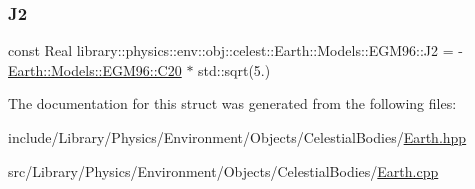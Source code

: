 \subsubsection{\texorpdfstring{J2}{J2}}
{\footnotesize\ttfamily const Real library\+::physics\+::env\+::obj\+::celest\+::\+Earth\+::\+Models\+::\+E\+G\+M96\+::\+J2 = -\/\hyperlink{structlibrary_1_1physics_1_1env_1_1obj_1_1celest_1_1_earth_1_1_models_1_1_e_g_m96_a37ac9f9643bf74cc47fa23b102cecf34}{Earth\+::\+Models\+::\+E\+G\+M96\+::\+C20} $\ast$ std\+::sqrt(5.)\hspace{0.3cm}{\ttfamily [static]}}



The documentation for this struct was generated from the following files\+:\begin{DoxyCompactItemize}
\item 
include/\+Library/\+Physics/\+Environment/\+Objects/\+Celestial\+Bodies/\hyperlink{_earth_8hpp}{Earth.\+hpp}\item 
src/\+Library/\+Physics/\+Environment/\+Objects/\+Celestial\+Bodies/\hyperlink{_earth_8cpp}{Earth.\+cpp}\end{DoxyCompactItemize}
